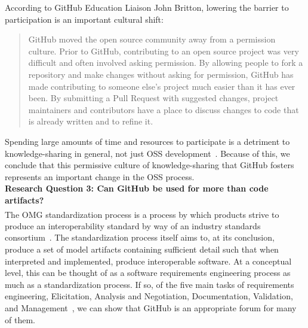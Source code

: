 \documentclass{proc}
\begin{document}
{{{{{According to GitHub Education Liaison John Britton, lowering the barrier to participation is an important cultural shift:
\begin{quote}
GitHub moved the open source community away from a permission culture. Prior to GitHub, contributing to an open source project was very difficult and often involved asking permission. By allowing people to fork a repository and make changes without asking for permission, GitHub has made contributing to someone else's project much easier than it has ever been. By submitting a Pull Request with suggested changes, project maintainers and contributors have a place to discuss changes to code that is already written and to refine it.~\cite{github_interview}
\end{quote}

Spending large amounts of time and resources to participate is a detriment to knowledge-sharing in general, not just OSS development~\cite{ardichvili2003motivation}. Because of this, we conclude that this permissive culture of knowledge-sharing that GitHub fosters represents an important change in the OSS process.\\

\noindent \textbf{Research Question 3: Can GitHub be used for more than code artifacts?}\\
The OMG\textsuperscript{\textregistered} standardization process is a process by which products strive to produce an interoperability standard by way of an industry standards consortium~\cite{omgTechProcess}.
The standardization process itself aims to, at its conclusion, produce a set of model artifacts containing sufficient detail such that when interpreted and implemented, produce interoperable software.
At a conceptual level, this can be thought of as a software requirements engineering process as much as a standardization process. If so, of the five main tasks of requirements engineering, Elicitation, Analysis and Negotiation, Documentation, Validation, and Management~\cite{sommerville1998requirements}, we can show that GitHub is an appropriate forum for many of them.

}}}}}
\end{document}
